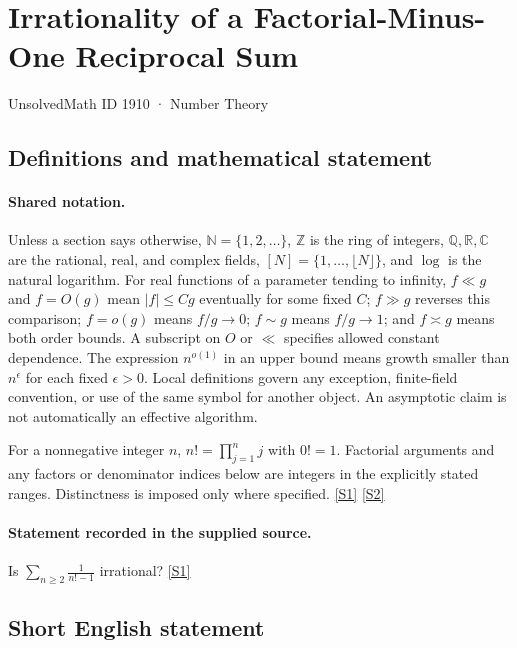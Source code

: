 \documentclass[11pt,a4paper]{article}
\newcommand{\N}{\mathbb{N}}
\newcommand{\Z}{\mathbb{Z}}
\newcommand{\Q}{\mathbb{Q}}
\newcommand{\R}{\mathbb{R}}
\newcommand{\C}{\mathbb{C}}
\newcommand{\sref}[2]{\hyperlink{source:#1:#2}{[S#2]}}
\begin{document}

\setcounter{section}{1909}

\section{Irrationality of a Factorial-Minus-One Reciprocal Sum}\label{1910}

{\small\sffamily UnsolvedMath ID 1910 · Number Theory}

\subsection{Definitions and mathematical statement}

\paragraph{Shared notation.}Unless a section says otherwise, $\N=\{1,2,\ldots\}$,
$\Z$ is the ring of integers, $\Q,\R,\C$ are the rational, real, and complex
fields, $[N]=\{1,\ldots,\lfloor N\rfloor\}$, and $\log$ is the natural
logarithm. For real functions of a parameter tending to infinity,
$f\ll g$ and $f=O(g)$ mean $|f|\leq Cg$ eventually for some fixed $C$;
$f\gg g$ reverses this comparison; $f=o(g)$ means $f/g\to0$;
$f\sim g$ means $f/g\to1$; and $f\asymp g$ means both order bounds.
A subscript on $O$ or $\ll$ specifies allowed constant dependence.
The expression $n^{o(1)}$ in an upper bound means growth smaller than
$n^\epsilon$ for each fixed $\epsilon>0$. Local definitions govern any
exception, finite-field convention, or use of the same symbol for another
object. An asymptotic claim is not automatically an effective algorithm.



For a nonnegative integer $n$, $n!=\prod_{j=1}^n j$ with $0!=1$. Factorial arguments and any factors or denominator indices below are integers in the explicitly stated ranges. Distinctness is imposed only where specified. \sref{1910}{1} \sref{1910}{2}

\paragraph{Statement recorded in the supplied source.}
Is $ \sum_{n\geq 2}\frac{1}{n!-1} $ irrational? \sref{1910}{1}

\subsection{Short English statement}
\end{document}
